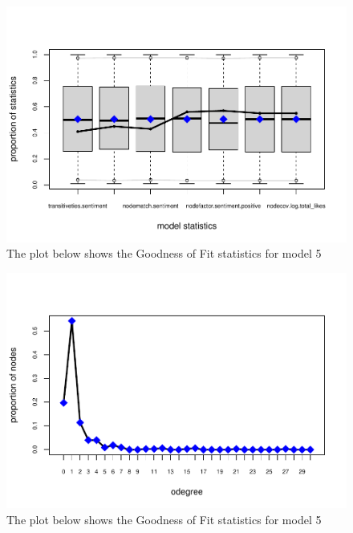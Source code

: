 \documentclass[
  man,floatsintext]{apa6}
\begin{document}
\begin{figure}[H]
\includegraphics{SNA4DS_Report_files/figure-latex/gof-model5-1} \caption{The plot below shows the Goodness of Fit statistics for model 5}\label{fig:gof-model5-1}
\end{figure}
\begin{figure}[H]
\includegraphics{SNA4DS_Report_files/figure-latex/gof-model5-2} \caption{The plot below shows the Goodness of Fit statistics for model 5}\label{fig:gof-model5-2}
\end{figure}
\end{document}

